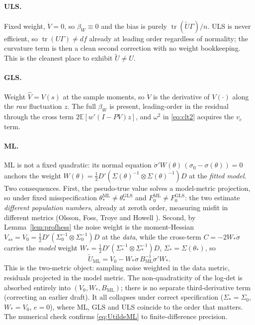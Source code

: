 \documentclass[11pt]{article}
\newcommand{\E}{\mathbb{E}}
\newcommand{\tr}{\operatorname{tr}}
\theoremstyle{plain}
\theoremstyle{remark}
\begin{document}
\paragraph{ULS.} Fixed weight, $\dot V=0$, so $\beta_W\equiv0$ and the bias is
purely $\tr(\tilde U\Gamma)/n$. ULS is never efficient, so $\tr(U\Gamma)\ne df$
already at leading order regardless of normality; the curvature term is then a
clean second correction with no weight bookkeeping. This is the cleanest place to
exhibit $\tilde U\ne U$.

\paragraph{GLS.} Weight $\hat V=V(s)$ at the sample moments, so $\dot V$ is the
derivative of $V(\cdot)$ along the \emph{raw} fluctuation $z$. The full $\beta_W$
is present, leading-order in the residual through the cross term
$2\E[w'(I-PV)z]$, and $\omega^2$ in \eqref{eq:clt2} acquires the $v_e$ term.

\paragraph{ML.} ML is not a fixed quadratic: its normal equation
$\dot\sigma'W(\theta)\,(\sigma_0-\sigma(\theta))=0$ anchors the weight
$W(\theta)=\tfrac12 D'(\Sigma(\theta)^{-1}\otimes\Sigma(\theta)^{-1})D$ at the
\emph{fitted model}. Two consequences. First, the pseudo-true value solves a
model-metric projection, so under fixed misspecification
$\theta_\ast^{\mathrm{ML}}\ne\theta_\ast^{\mathrm{GLS}}$ and
$F_0^{\mathrm{ML}}\ne F_0^{\mathrm{GLS}}$: the two estimate \emph{different
population numbers}, already at zeroth order, measuring misfit in different
metrics (Olsson, Foss, Troye and Howell \cite{olssonetal2000}). Second, by
Lemma~\ref{lem:profhess} the noise weight is the moment-Hessian
$V_{ss}=V_0=\tfrac12 D'(\Sigma_0^{-1}\otimes\Sigma_0^{-1})D$ at the \emph{data},
while the cross-term $C=-2W_\ast\dot\sigma$ carries the \emph{model} weight
$W_\ast=\tfrac12 D'(\Sigma_\ast^{-1}\otimes\Sigma_\ast^{-1})D$,
$\Sigma_\ast=\Sigma(\theta_\ast)$, so
\begin{equation}\label{eq:UtildeML}
  \tilde U_{\mathrm{ML}} = V_0 - W_\ast\dot\sigma\,B_{\mathrm{ML}}^{-1}\dot\sigma'W_\ast .
\end{equation}
This is the two-metric object: sampling noise weighted in the data metric,
residuals projected in the model metric. The non-quadraticity of the log-det is
absorbed entirely into $(V_0,W_\ast,B_{\mathrm{ML}})$; there is no separate
third-derivative term (correcting an earlier draft). It all collapses under
correct specification ($\Sigma_\ast=\Sigma_0$, $W_\ast=V_0$, $e=0$), where ML, GLS
and ULS coincide to the order that matters. The numerical check confirms
\eqref{eq:UtildeML} to finite-difference precision.
\end{document}
